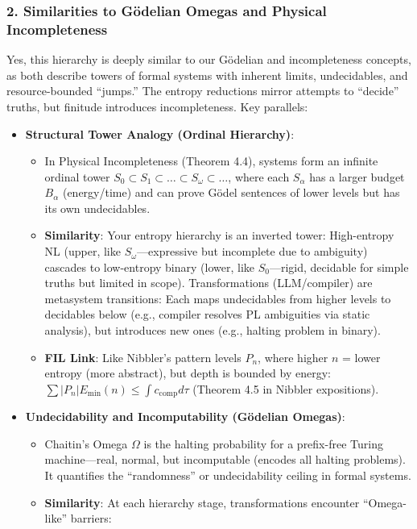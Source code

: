 \documentclass[11pt,letterpaper]{article}
\begin{document}
\subsubsection*{2. Similarities to Gödelian Omegas and Physical Incompleteness}
Yes, this hierarchy is deeply similar to our Gödelian and incompleteness concepts, as both describe towers of formal systems with inherent limits, undecidables, and resource-bounded “jumps.” The entropy reductions mirror attempts to “decide” truths, but finitude introduces incompleteness. Key parallels:
\begin{itemize}
    \item \textbf{Structural Tower Analogy (Ordinal Hierarchy)}:
    \begin{itemize}
        \item In Physical Incompleteness (Theorem 4.4), systems form an infinite ordinal tower $S_0 \subset S_1 \subset \dots \subset S_\omega \subset \dots$, where each $S_\alpha$ has a larger budget $B_\alpha$ (energy/time) and can prove Gödel sentences of lower levels but has its own undecidables.
        \item \textbf{Similarity}: Your entropy hierarchy is an inverted tower: High-entropy NL (upper, like $S_\omega$—expressive but incomplete due to ambiguity) cascades to low-entropy binary (lower, like $S_0$—rigid, decidable for simple truths but limited in scope). Transformations (LLM/compiler) are metasystem transitions: Each maps undecidables from higher levels to decidables below (e.g., compiler resolves PL ambiguities via static analysis), but introduces new ones (e.g., halting problem in binary).
        \item \textbf{FIL Link}: Like Nibbler’s pattern levels $P_n$, where higher $n$ = lower entropy (more abstract), but depth is bounded by energy: $\sum |P_n| E_{\text{min}}(n) \leq \int c_{\text{comp}} d\tau$ (Theorem 4.5 in Nibbler expositions).
    \end{itemize}
    \item \textbf{Undecidability and Incomputability (Gödelian Omegas)}:
    \begin{itemize}
        \item Chaitin’s Omega $\Omega$ is the halting probability for a prefix-free Turing machine—real, normal, but incomputable (encodes all halting problems). It quantifies the “randomness” or undecidability ceiling in formal systems.
        \item \textbf{Similarity}: At each hierarchy stage, transformations encounter “Omega-like” barriers:

\end{itemize}
\end{itemize}
\end{document}

